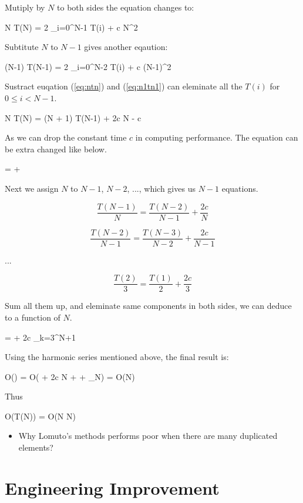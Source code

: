 \documentclass{article}
\begin{document}
Mutiply by $N$ to both sides the equation changes to:

\be
N T(N) = 2 \sum_{i=0}^{N-1} T(i) + c N^2
\label{eq:ntn}
\ee

Subtitute $N$ to $N-1$ gives another eqaution:

\be
(N-1) T(N-1) = 2 \sum_{i=0}^{N-2} T(i) + c (N-1)^2
\label{eq:n1tn1}
\ee

Sustract euqation (\ref{eq:ntn}) and (\ref{eq:n1tn1}) can eleminate all the $T(i)$ for $0 \leq i < N-1$.

\be
N T(N) = (N + 1) T(N-1) + 2c N - c
\ee

As we can drop the constant time $c$ in computing performance. The equation can be extra changed like
below.

\be
{} =  + 
\ee

Next we assign $N$ to $N-1$, $N-2$, ..., which gives us $N-1$ equations.

\[
\frac{T(N-1)}{N} = \frac{T(N-2)}{N-1} + \frac{2c}{N}
\]

\[
\frac{T(N-2)}{N-1} = \frac{T(N-3)}{N-2} + \frac{2c}{N-1}
\]

...

\[
\frac{T(2)}{3} = \frac{T(1)}{2} + \frac{2c}{3}
\]

Sum all them up, and eleminate same components in both sides, we can deduce to a function of $N$.

\be
{} =  + 2c \sum_{k=3}^{N+1} 
\ee

Using the harmonic series mentioned above, the final result is:

\be
O() = O( + 2c \ln N + \gamma + \epsilon_N) = O(\lg N)
\ee

Thus

\be
O(T(N)) = O(N \lg N)
\ee

\begin{Exercise}
\begin{itemize}
\item Why Lomuto's methods performs poor when there are many duplicated elements?
\end{itemize}  
\end{Exercise}


\section{Engineering Improvement}
\end{document}
